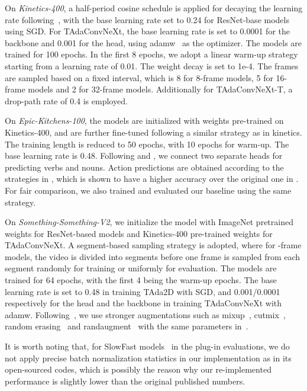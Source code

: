 \documentclass{article} \usepackage{iclr2022_conference,times}
\begin{document}
On \textit{Kinetics-400}, a half-period cosine schedule is applied for decaying the learning rate following~\citet{slowfast}, with the base learning rate set to 0.24 for ResNet-base models using SGD. For TAdaConvNeXt, the base learning rate is set to 0.0001 for the backbone and 0.001 for the head, using adamw~\citep{adamw} as the optimizer. The models are trained for 100 epochs. In the first 8 epochs, we adopt a linear warm-up strategy starting from a learning rate of 0.01. The weight decay is set to 1e-4. The frames are sampled based on a fixed interval, which is 8 for 8-frame models, 5 for 16-frame models and 2 for 32-frame models. Additionally for TAdaConvNeXt-T, a drop-path rate of 0.4 is employed.

On \textit{Epic-Kitchens-100}, the models are initialized with weights pre-trained on Kinetics-400, and are further fine-tuned following a similar strategy as in kinetics. The training length is reduced to 50 epochs, with 10 epochs for warm-up.
The base learning rate is 0.48.
Following \citet{ek100} and \citet{vivitek100}, we connect two separate heads for predicting verbs and nouns. Action predictions are obtained according to the strategies in \citet{vivitek100}, which is shown to have a higher accuracy over the original one in \citet{ek100}. For fair comparison, we also trained and evaluated our baseline using the same strategy.

On \textit{Something-Something-V2}, we initialize the model with ImageNet pretrained weights for ResNet-based models and Kinetics-400 pre-trained weights for TAdaConvNeXt.
A segment-based sampling strategy is adopted, where for -frame models, the video is divided into  segments before one frame is sampled from each segment randomly for training or uniformly for evaluation. 
The models are trained for 64 epochs, with the first 4 being the warm-up epochs. 
The base learning rate is set to 0.48 in training TAda2D with SGD, and 0.001/0.0001 respectively for the head and the backbone in training TAdaConvNeXt with adamw. Following~\citet{videoswin}, we use stronger augmentations such as mixup~\citep{mixup}, cutmix~\citep{cutmix}, random erasing~\citep{randomerasing} and randaugment~\citep{randaugment} with the same parameters in~\citet{convnext}.

It is worth noting that, for SlowFast models~\citep{slowfast} in the plug-in evaluations, we do not apply precise batch normalization statistics in our implementation as in its open-sourced codes, which is possibly the reason why our re-implemented performance is slightly lower than the original published numbers. 
\end{document}
